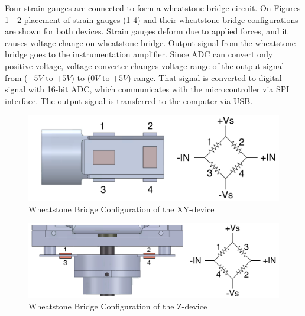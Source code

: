 Four strain gauges are connected to form a wheatstone bridge circuit. On Figures \ref{fig:WB_xy_dev} - \ref{fig:WB_z} placement of strain gauges (1-4) and their wheatstone bridge configurations are shown for both devices. Strain gauges deform due to applied forces, and it causes voltage change on wheatstone bridge. Output signal from the wheatstone bridge goes to the instrumentation amplifier. Since ADC can convert only positive voltage, voltage converter changes voltage range of the output signal from ($-5V$ to $+5V$) to ($0V$ to $+5V$) range. That signal is converted to digital signal with 16-bit ADC, which communicates with the microcontroller via SPI interface. The output signal is transferred to the computer via USB. 
	
\begin{figure}[h]
	\begin{center}
		\includegraphics[width=120mm]{fig/methods/Wiring_xy_sleeve.pdf}
	\end{center}
	\vspace{-4mm}
	\caption[Wheatstone Bridge Configuration of the XY-device]
	{Wheatstone Bridge Configuration of the XY-device}
	\label{fig:WB_xy_dev}
	\vspace{-2mm}
\end{figure}

\begin{figure}[h]
	\begin{center}
		\includegraphics[width=140mm]{fig/methods/Wiring_z.pdf}
	\end{center}
	\vspace{-4mm}
	\caption[Wheatstone Bridge Configuration of the Z-device]
	{Wheatstone Bridge Configuration of the Z-device}
	\label{fig:WB_z}
	\vspace{-2mm}
\end{figure}
	
